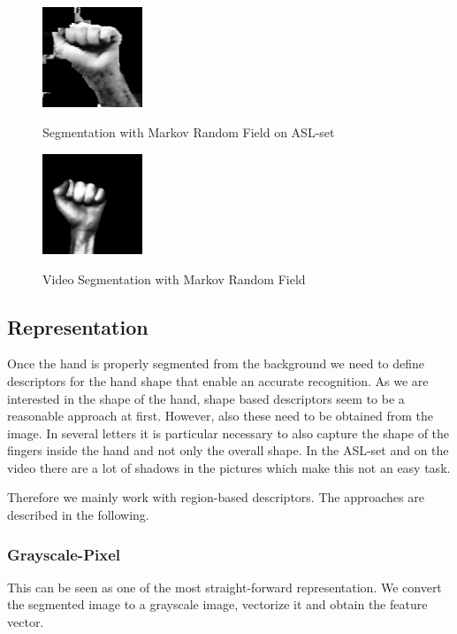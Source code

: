 \documentclass[letterpaper, 10 pt, conference]{ieeeconf}  %
\begin{document}
\begin{figure}
	\centering
	\begin{minipage}{0.4\linewidth}
		\centering
		\includegraphics[height=3cm]{mrf}
		\label{fig:mrf-example}
		\caption{Segmentation with Markov Random Field on ASL-set}
	\end{minipage}
	\hfill
	\begin{minipage}{0.4\linewidth}
		\centering
		\includegraphics[height=3cm]{mrf-video}
		\label{fig:mrf-example-video}
		\caption{Video Segmentation with Markov Random Field}
	\end{minipage}
\end{figure}


\subsection{Representation}

Once the hand is properly segmented from the background we need to define descriptors for the hand shape that enable an accurate recognition. As we are interested in the shape of the hand, shape based descriptors seem to be a reasonable approach at first. However, also these need to be obtained from the image. In several letters it is particular necessary to also capture the shape of the fingers inside the hand and not only the overall shape. In the ASL-set and on the video there are a lot of shadows in the pictures which make this not an easy task.

Therefore we mainly work with region-based descriptors. The approaches are described in the following.

\subsubsection{Grayscale-Pixel}

This can be seen as one of the most straight-forward representation. We convert the segmented image to a grayscale image, vectorize it and obtain the feature vector.
\end{document}
